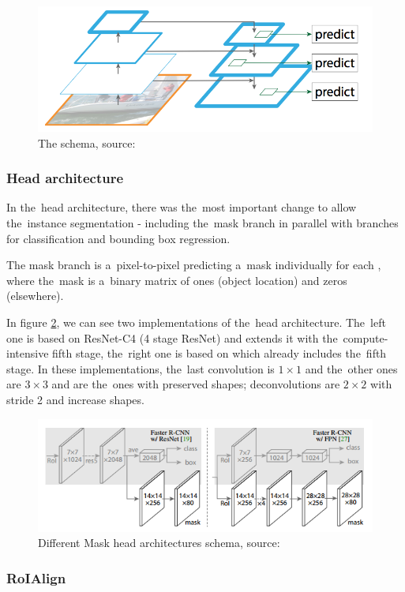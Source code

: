 \begin{figure}[H]
   \centering
	\includegraphics[width=0.4\linewidth]{./pictures/top-down.png}
	\caption[Feature pyramid network]{The  schema, source: \cite{fpn}}
      \label{fig:fpn}
\end{figure}

\subsubsection{Head architecture}
\label{head}

In the~head architecture, there was the~most important change to allow
the~instance segmentation - including the~mask branch in parallel with branches for 
classification and bounding box regression. 

The mask branch is a~pixel-to-pixel  predicting a~mask individually for 
each , where the~mask is a~binary matrix of ones (object location) and zeros 
(elsewhere).

In figure \ref{fig:head}, we can see two implementations of the~head 
architecture. The~left one is based on ResNet-C4 (4 stage ResNet) and extends it 
with the~compute-intensive fifth stage, the~right one is based on  which 
already includes the~fifth stage. In these implementations, the~last convolution 
is $1 \times 1$ and the~other ones are $3 \times 3$ and are the~ones with 
preserved shapes; deconvolutions are $2 \times 2$ with stride 2 and increase 
shapes. 

\begin{figure}[H]
   \centering
	\includegraphics[width=0.7\linewidth]{./pictures/maskrcnn-head.png}
	\caption[Mask R-CNN head architecture]{Different Mask  head 
architectures schema, source: \cite{mask-rcnn}}
      \label{fig:head}
\end{figure}

\subsubsection{RoIAlign}
\label{roialign}

